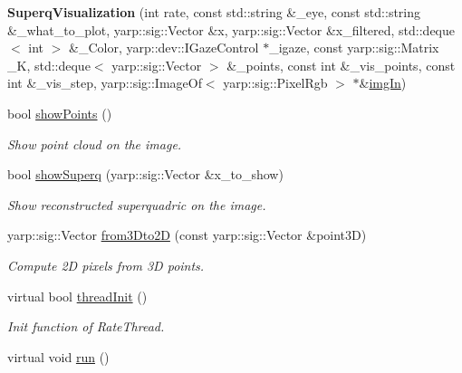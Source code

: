 \begin{DoxyCompactItemize}
\item 
{\bfseries Superq\-Visualization} (int rate, const std\-::string \&\-\_\-eye, const std\-::string \&\-\_\-what\-\_\-to\-\_\-plot, yarp\-::sig\-::\-Vector \&x, yarp\-::sig\-::\-Vector \&x\-\_\-filtered, std\-::deque$<$ int $>$ \&\-\_\-\-Color, yarp\-::dev\-::\-I\-Gaze\-Control $\ast$\-\_\-igaze, const yarp\-::sig\-::\-Matrix \-\_\-\-K, std\-::deque$<$ yarp\-::sig\-::\-Vector $>$ \&\-\_\-points, const int \&\-\_\-vis\-\_\-points, const int \&\-\_\-vis\-\_\-step, yarp\-::sig\-::\-Image\-Of$<$ yarp\-::sig\-::\-Pixel\-Rgb $>$ $\ast$\&\hyperlink{classSuperqVisualization_a884771e5af001207eb1ba6e9ac15f8a1}{img\-In})\label{classSuperqVisualization_ae6d66a2ecd9c3d544c930e67f89d7d61}

\item 
bool \hyperlink{classSuperqVisualization_aea374f59e3b941e688c1ddafad8896b9}{show\-Points} ()
\begin{DoxyCompactList}\small\item\em Show point cloud on the image. \end{DoxyCompactList}\item 
bool \hyperlink{classSuperqVisualization_aa763f8f73c82d4de1d47b03ae9d2e276}{show\-Superq} (yarp\-::sig\-::\-Vector \&x\-\_\-to\-\_\-show)
\begin{DoxyCompactList}\small\item\em Show reconstructed superquadric on the image. \end{DoxyCompactList}\item 
yarp\-::sig\-::\-Vector \hyperlink{classSuperqVisualization_aff405a4d0ad916decad09f923e319be6}{from3\-Dto2\-D} (const yarp\-::sig\-::\-Vector \&point3\-D)
\begin{DoxyCompactList}\small\item\em Compute 2\-D pixels from 3\-D points. \end{DoxyCompactList}\item 
virtual bool \hyperlink{classSuperqVisualization_a93dc1583d46a71bbcc4e4ef7f65820b9}{thread\-Init} ()\label{classSuperqVisualization_a93dc1583d46a71bbcc4e4ef7f65820b9}

\begin{DoxyCompactList}\small\item\em Init function of Rate\-Thread. \end{DoxyCompactList}\item 
virtual void \hyperlink{classSuperqVisualization_a46d689c65cec6c04d3fffdbfbbd1838b}{run} ()\label{classSuperqVisualization_a46d689c65cec6c04d3fffdbfbbd1838b}


\end{DoxyCompactItemize}
